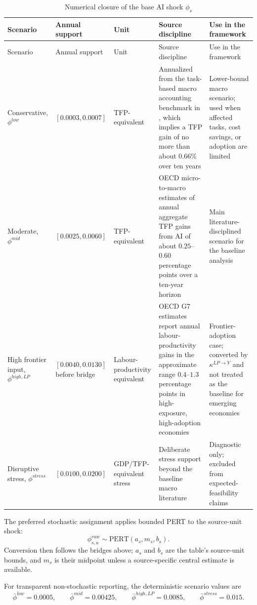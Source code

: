 \documentclass[11pt,a4paper]{article}
\begin{document}
\begin{longtable}{p{}p{}p{}p{}p{}}
\caption{Numerical closure of the base AI shock $\phi_s$}\label{tab:phi_numerical_closure}\\
\toprule
Scenario & Annual support & Unit & Source discipline & Use in the framework \\
\midrule
\endfirsthead
\toprule
Scenario & Annual support & Unit & Source discipline & Use in the framework \\
\midrule
\endhead
Conservative, $\phi^{low}$ & $[0.0003,0.0007]$ & TFP-equivalent & Annualized from the task-based macro accounting benchmark in \citet{acemoglu2024simple}, which implies a TFP gain of no more than about $0.66\%$ over ten years & Lower-bound macro scenario; used when affected tasks, cost savings, or adoption are limited \\
Moderate, $\phi^{mid}$ & $[0.0025,0.0060]$ & TFP-equivalent & OECD micro-to-macro estimates of annual aggregate TFP gains from AI of about $0.25$--$0.60$ percentage points over a ten-year horizon \citep{filippucci2024miracle} & Main literature-disciplined scenario for the baseline analysis \\
High frontier input, $\phi^{high,LP}$ & $[0.0040,0.0130]$ before bridge & Labour-productivity equivalent & OECD G7 estimates report annual labour-productivity gains in the approximate range $0.4$--$1.3$ percentage points in high-exposure, high-adoption economies \citep{oecd2025g7} & Frontier-adoption case; converted by $\kappa^{LP\to Y}$ and not treated as the baseline for emerging economies \\
Disruptive stress, $\phi^{stress}$ & $[0.0100,0.0200]$ & GDP/TFP-equivalent stress & Deliberate stress support beyond the baseline macro literature & Diagnostic only; excluded from expected-feasibility claims \\
\bottomrule
\end{longtable}

The preferred stochastic assignment applies bounded PERT to the source-unit shock:
\begin{equation}
    \phi^{raw}_{s,u}\sim \mathrm{PERT}(a_s,m_s,b_s).
\end{equation}
Conversion then follows the bridges above; $a_s$ and $b_s$ are the table's source-unit bounds, and $m_s$ is their midpoint unless a source-specific central estimate is available.

For transparent non-stochastic reporting, the deterministic scenario values are
\begin{equation}
    \bar\phi^{low}=0.0005,
    \qquad
    \bar\phi^{mid}=0.00425,
    \qquad
    \bar\phi^{high,LP}=0.0085,
    \qquad
    \bar\phi^{stress}=0.015.
\end{equation}
\end{document}
